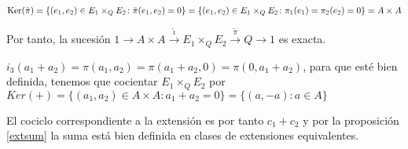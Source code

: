 \begin{proposicion}
\begin{demostracion}
		$\operatorname{Ker}(\tilde \pi) = \{(e_1,e_2)\in E_1\times_Q E_2 \colon \tilde\pi(e_1,e_2)=0\}=\{(e_1,e_2)\in E_1\times_Q E_2 \colon \pi_1(e_1)=\pi_2(e_2)=0\} = A\times A$
	
		Por tanto, la sucesión $1\xrightarrow{} A\times A \xrightarrow{\tilde\imath} E_1\times_Q E_2\xrightarrow{\tilde\pi} Q \xrightarrow{} 1$ es exacta.
		
		$i_3(a_1+a_2)=\pi(a_1,a_2)=\pi(a_1+a_2,0)=\pi(0,a_1+a_2)$, para que esté bien definida, tenemos que cocientar $E_1\times_Q E_2$ por $Ker(+)=\{(a_1,a_2)\in A\times A \colon a_1+a_2=0\}=\{(a,-a) \colon a\in A\}$
		
		
		El cociclo correspondiente a la extensión es por tanto $c_1+c_2$ y por la proposición \ref{extsum} la suma está bien definida en clases de extensiones equivalentes.
	\end{demostracion}
\end{proposicion}
